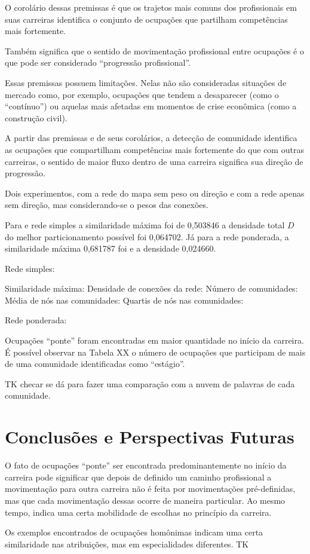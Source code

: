\documentclass[
  article,
  11pt,
  a4paper,
  english,
  brazil,
  sumario=tradicional]{abntex2}
\begin{document}
O corolário dessas premissas é que os trajetos mais comuns dos profissionais em suas carreiras identifica o conjunto de ocupações que partilham competências mais fortemente.

Também significa que o sentido de movimentação profissional entre ocupações é o que pode ser considerado \enquote{progressão profissional}.

Essas premissas possuem limitações. Nelas não são consideradas situações de mercado como, por exemplo, ocupações que tendem a desaparecer (como o \enquote{contínuo}) ou aquelas mais afetadas em momentos de crise econômica (como a construção civil).

A partir das premissas e de seus corolários, a detecção de comunidade identifica as ocupações que compartilham competências mais fortemente do que com outras carreiras, o sentido de maior fluxo dentro de uma carreira significa sua direção de progressão.


Dois experimentos, com a rede do mapa sem peso ou direção e com a rede apenas sem direção, mas considerando-se o pesos das conexões.

Para e rede simples a similaridade máxima foi de 0,503846 a densidade total $D$ do melhor particionamento possível foi 0,064702. Já para a rede ponderada, a similaridade máxima 0,681787 foi e a densidade 0,024660.

Rede simples:

Similaridade máxima:
Densidade de conexões da rede:
Número de comunidades:
Média de nós nas comunidades:
Quartis de nós nas comunidades:

Rede ponderada:




Ocupações \enquote{ponte} foram encontradas em maior quantidade no início da carreira. É possível observar na Tabela XX o número de ocupações que participam de mais de uma comunidade identificadas como \enquote{estágio}.

TK checar se dá para fazer uma comparação com a nuvem de palavras de cada comunidade.

\section{Conclusões e Perspectivas Futuras}

O fato de ocupações \enquote{ponte} ser encontrada predominantemente no início da carreira pode significar que depois de definido um caminho profissional a movimentação para outra carreira não é feita por movimentações pré-definidas, mas que cada movimentação dessas ocorre de maneira particular. Ao mesmo tempo, indica uma certa mobilidade de escolhas no princípio da carreira.

Os exemplos encontrados de ocupações homônimas indicam uma certa similaridade nas atribuições, mas em especialidades diferentes. TK

\newpage


\end{document}
